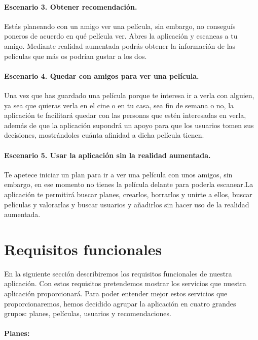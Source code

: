 \paragraph{Escenario 3. Obtener recomendación.}
    Estás planeando con un amigo ver una película, sin embargo, no conseguís poneros de acuerdo en qué película ver. Abres la aplicación y escaneas a tu amigo. Mediante realidad aumentada podrás obtener la información de las películas que más os podrían gustar a los dos. 



\paragraph{Escenario 4. Quedar con amigos para ver una película.}
    Una vez que has guardado una película porque te interesa ir a verla con alguien, ya sea que quieras verla en el cine o en tu casa, sea fin de semana o no, la aplicación te facilitará quedar 
    con las personas que estén interesadas en verla, además de que la aplicación supondrá un apoyo para que los usuarios tomen sus decisiones, mostrándoles cuánta afinidad a dicha película tienen.

\paragraph{Escenario 5. Usar la aplicación sin la realidad aumentada.}
    Te apetece iniciar un plan para ir a ver una película con unos amigos, sin embargo, en ese momento no tienes la película 
    delante para poderla escanear.La aplicación te permitirá buscar 
     planes, crearlos, borrarlos y unirte a ellos, buscar películas y valorarlas y buscar usuarios y añadirlos sin hacer uso de la realidad aumentada.

\section{Requisitos funcionales}
\label{makereference3.3}
En la siguiente sección describiremos los requisitos funcionales de nuestra aplicación. Con estos requisitos pretendemos mostrar los servicios que nuestra aplicación proporcionará.
Para poder entender mejor estos servicios que proporcionaremos, hemos decidido agrupar la aplicación en cuatro grandes grupos: planes, películas, usuarios y recomendaciones.

\paragraph{\large Planes:\\}

